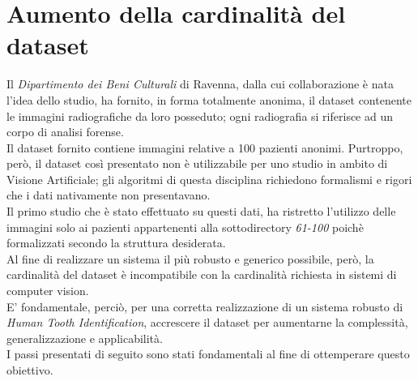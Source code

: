 \documentclass[12pt,a4paper,openright,twoside]{book}
\begin{document}
\chapter{Aumento della cardinalità del dataset}
Il {\itshape Dipartimento dei Beni Culturali} di Ravenna, dalla cui collaborazione è nata l'idea dello studio, ha fornito, in forma totalmente anonima, il dataset contenente le immagini radiografiche da loro posseduto; ogni radiografia si riferisce ad un corpo di analisi forense. \\
Il dataset fornito contiene immagini relative a 100 pazienti anonimi. Purtroppo, però, il dataset così presentato non è utilizzabile per uno studio in ambito di Visione Artificiale; gli algoritmi di questa disciplina richiedono formalismi e rigori che i dati nativamente non presentavano.\\

Il primo studio che è stato effettuato su questi dati, ha ristretto l'utilizzo delle immagini solo ai pazienti appartenenti alla sottodirectory {\itshape 61-100} poichè formalizzati secondo la struttura desiderata.\\
Al fine di realizzare un sistema il più robusto e generico possibile, però, la cardinalità del dataset è incompatibile con la cardinalità richiesta in sistemi di computer vision.\\
E' fondamentale, perciò, per una corretta realizzazione di un sistema robusto di {\itshape Human Tooth Identification}, accrescere il dataset per aumentarne la complessità, generalizzazione e applicabilità.\\
I passi presentati di seguito sono stati fondamentali al fine di ottemperare questo obiettivo.
\end{document}
